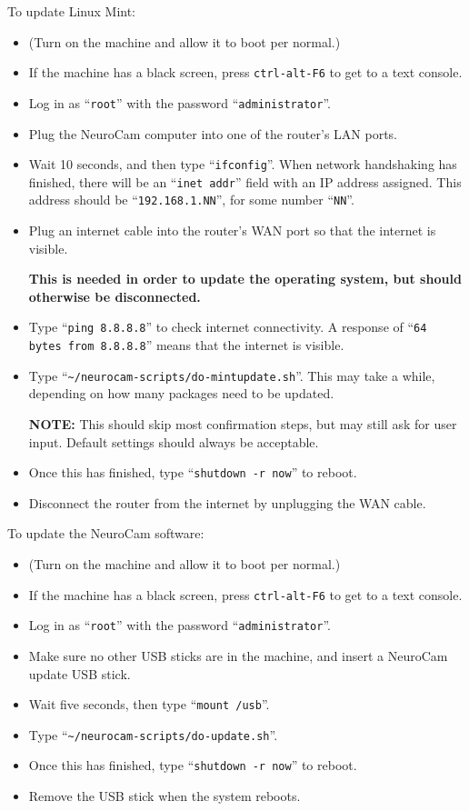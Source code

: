 To update Linux Mint:
\begin{itemize}
%
\item (Turn on the machine and allow it to boot per normal.)
\item If the machine has a black screen, press \verb+ctrl-alt-F6+ to get
to a text console.
\item Log in as ``\verb+root+'' with the password ``\verb+administrator+''.
\item Plug the NeuroCam computer into one of the router's LAN ports.
\item Wait 10 seconds, and then type ``\verb+ifconfig+''. When network
handshaking has finished, there will be an ``\verb+inet addr+'' field with
an IP address assigned. This address should be ``\verb+192.168.1.NN+'', for
some number ``\verb+NN+''.
\item Plug an internet cable into the router's WAN port so that the internet
is visible.
\par
\textbf{This is needed in order to update the operating system, but should
otherwise be disconnected.}
\item Type ``\verb+ping 8.8.8.8+'' to check internet connectivity. A response
of ``\verb+64 bytes from 8.8.8.8+'' means that the internet is visible.
\item Type ``\verb+~/neurocam-scripts/do-mintupdate.sh+''. This may take a
while, depending on how many packages need to be updated.
\par
\textbf{NOTE:} This should skip most confirmation steps, but may still ask for
user input. Default settings should always be acceptable.
\item Once this has finished, type ``\verb+shutdown -r now+'' to reboot.
\item Disconnect the router from the internet by unplugging the WAN cable.
\end{itemize}

To update the NeuroCam software:
\begin{itemize}
%
\item (Turn on the machine and allow it to boot per normal.)
\item If the machine has a black screen, press \verb+ctrl-alt-F6+ to get
to a text console.
\item Log in as ``\verb+root+'' with the password ``\verb+administrator+''.
\item Make sure no other USB sticks are in the machine, and insert a
NeuroCam update USB stick.
\item Wait five seconds, then type ``\verb+mount /usb+''.
\item Type ``\verb+~/neurocam-scripts/do-update.sh+''.
\item Once this has finished, type ``\verb+shutdown -r now+'' to reboot.
\item Remove the USB stick when the system reboots.
%
\end{itemize}

